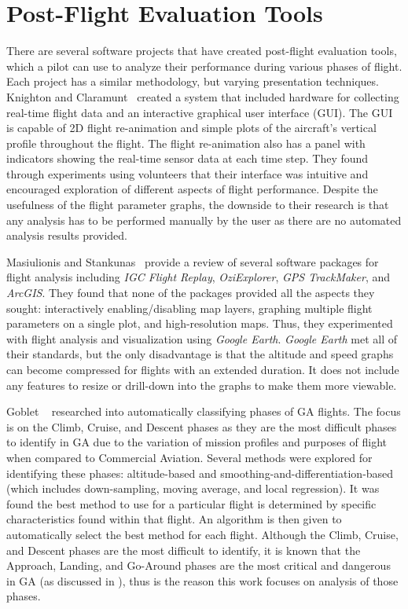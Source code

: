 \section{Post-Flight Evaluation Tools}

	There are several software projects that have created post-flight evaluation tools, which a pilot can use to analyze their performance during various phases of flight.  Each project has a similar methodology, but varying presentation techniques.  Knighton and Claramunt~\cite{knighton2001an-aeronautical} created a system that included hardware for collecting real-time flight data and an interactive graphical user interface (GUI).  The GUI is capable of 2D flight re-animation and simple plots of the aircraft's vertical profile throughout the flight.  The flight re-animation also has a panel with indicators showing the real-time sensor data at each time step.  They found through experiments using volunteers that their interface was intuitive and encouraged exploration of different aspects of flight performance.  Despite the usefulness of the flight parameter graphs, the downside to their research is that any analysis has to be performed manually by the user as there are no automated analysis results provided.
    
    Masiulionis and Stankunas~\cite{masiulionis2017review} provide a review of several software packages for flight analysis including \textit{IGC Flight Replay}, \textit{OziExplorer}, \textit{GPS TrackMaker}, and \textit{ArcGIS}.  They found that none of the packages provided all the aspects they sought:  interactively enabling/disabling map layers, graphing multiple flight parameters on a single plot, and high-resolution maps.  Thus, they experimented with flight analysis and visualization using \textit{Google Earth}.  \textit{Google Earth} met all of their standards, but the only disadvantage is that the altitude and speed graphs can become compressed for flights with an extended duration.  It does not include any features to resize or drill-down into the graphs to make them more viewable.
    
    Goblet \etal~\cite{goblet2016phase,goblet2015identifying} researched into automatically classifying phases of GA flights.  The focus is on the Climb, Cruise, and Descent phases as they are the most difficult phases to identify in GA due to the variation of mission profiles and purposes of flight when compared to Commercial Aviation. Several methods were explored for identifying these phases:  altitude-based and smoothing-and-differentiation-based (which includes down-sampling, moving average, and local regression).  It was found the best method to use for a particular flight is determined by specific characteristics found within that flight.  An algorithm is then given to automatically select the best method for each flight.  Although the Climb, Cruise, and Descent phases are the most difficult to identify, it is known that the Approach, Landing, and Go-Around phases are the most critical and dangerous in GA (as discussed in ), thus is the reason this work focuses on analysis of those phases. 
    
